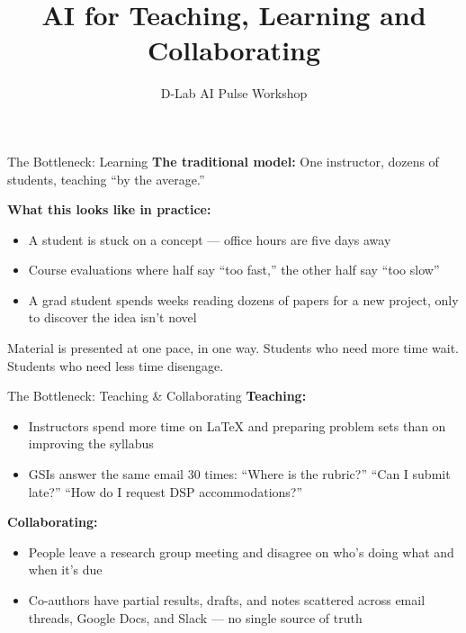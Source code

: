 \documentclass[aspectratio=169]{beamer}
\title{AI for Teaching, Learning and Collaborating}
\subtitle{D-Lab AI Pulse Workshop}
\author{}
\date{}
\begin{document}
\begin{frame}[plain]
    \titlepage
\end{frame}


\begin{frame}{The Bottleneck: Learning}
    \textbf{The traditional model:} One instructor, dozens of students, teaching ``by the average.''

    \vspace{1em}
    \textbf{What this looks like in practice:}
    \begin{itemize}
        \item A student is stuck on a concept --- office hours are five days away
        \item Course evaluations where half say ``too fast,'' the other half say ``too slow''
        \item A grad student spends weeks reading dozens of papers for a new project, only to discover the idea isn't novel
    \end{itemize}

    \vspace{1em}
    Material is presented at one pace, in one way. Students who need more time wait. Students who need less time disengage.
\end{frame}

\begin{frame}{The Bottleneck: Teaching \& Collaborating}
    \textbf{Teaching:}
    \begin{itemize}
        \item Instructors spend more time on \LaTeX{} and preparing problem sets than on improving the syllabus
        \item GSIs answer the same email 30 times: ``Where is the rubric?'' ``Can I submit late?'' ``How do I request DSP accommodations?''
    \end{itemize}

    \vspace{1em}
    \textbf{Collaborating:}
    \begin{itemize}
        \item People leave a research group meeting and disagree on who's doing what and when it's due
        \item Co-authors have partial results, drafts, and notes scattered across email threads, Google Docs, and Slack --- no single source of truth
    \end{itemize}
\end{frame}
\end{document}
